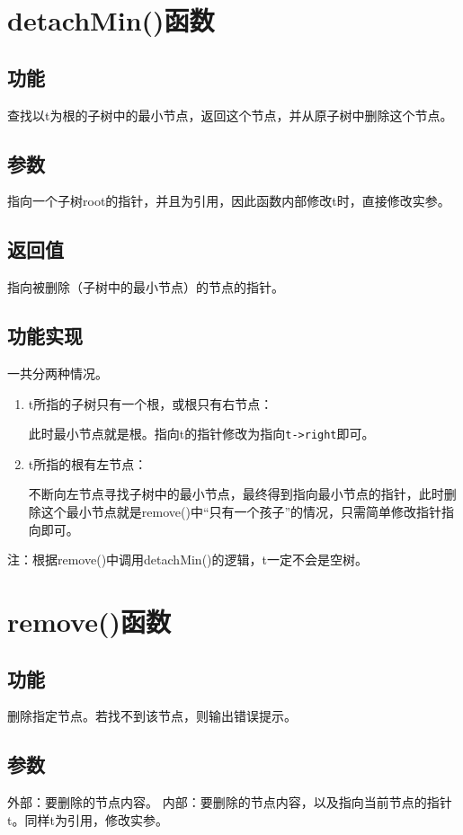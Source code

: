 \documentclass[UTF8]{ctexart}
\begin{document}
\pagestyle{fancy}
\fancyhead{}

\section{detachMin()函数}
\subsection{功能}
查找以t为根的子树中的最小节点，返回这个节点，并从原子树中删除这个节点。
\subsection{参数}
指向一个子树root的指针，并且为引用，因此函数内部修改t时，直接修改实参。
\subsection{返回值}
指向被删除（子树中的最小节点）的节点的指针。
\subsection{功能实现}
一共分两种情况。
\begin{enumerate}
\item t所指的子树只有一个根，或根只有右节点：

此时最小节点就是根。指向t的指针修改为指向\lstinline{t->right}即可。
\item t所指的根有左节点：

不断向左节点寻找子树中的最小节点，最终得到指向最小节点的指针，此时删除这个最小节点就是remove()中“只有一个孩子”的情况，只需简单修改指针指向即可。
\end{enumerate}
注：根据remove()中调用detachMin()的逻辑，t一定不会是空树。

\section{remove()函数}
\subsection{功能}
删除指定节点。若找不到该节点，则输出错误提示。
\subsection{参数}
外部：要删除的节点内容。
内部：要删除的节点内容，以及指向当前节点的指针t。同样t为引用，修改实参。
\end{document}
